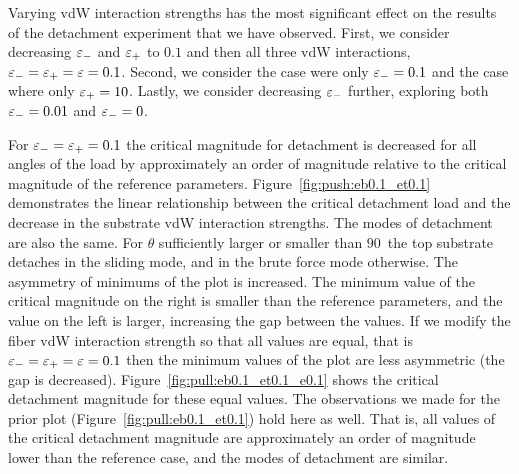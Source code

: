 {Varying vdW interaction strengths has the most significant effect on the results of the detachment experiment that we have observed. First, we consider decreasing $\varepsilon_-$ and $\varepsilon_+$ to $0.1$ and then all three vdW interactions, $\varepsilon_- = \varepsilon_+ = \varepsilon = 0.1$. Second, we consider the case were only $\varepsilon_-=0.1$ and the case where only $\varepsilon_+=10$. Lastly, we consider decreasing $\varepsilon_-$ further, exploring both $\varepsilon_-=0.01$ and $\varepsilon_-=0$.

For $\varepsilon_- = \varepsilon_+ = 0.1$ the critical magnitude for detachment is decreased for all angles of the load by approximately an order of magnitude relative to the critical magnitude of the reference parameters. Figure~\ref{fig:push:eb0.1_et0.1} demonstrates the linear relationship between the critical detachment load and the decrease in the substrate vdW interaction strengths. The modes of detachment are also the same. For $\theta$ sufficiently larger or smaller than $90$\textdegree\ the top substrate detaches in the sliding mode, and in the brute force mode otherwise. The asymmetry of minimums of the plot is increased. The minimum value of the critical magnitude on the right is smaller than the reference parameters, and the  value on the left is larger, increasing the gap between the values. If we modify the fiber vdW interaction strength so that all values are equal, that is $\varepsilon_- = \varepsilon_+ = \varepsilon = 0.1$ then the minimum values of the plot are less asymmetric (the gap is decreased). Figure~\ref{fig:pull:eb0.1_et0.1_e0.1} shows the critical detachment magnitude for these equal values. The observations we made for the prior plot (Figure~\ref{fig:pull:eb0.1_et0.1}) hold here as well. That is, all values of the critical detachment magnitude are approximately an order of magnitude lower than the reference case, and the modes of detachment are similar.

}
